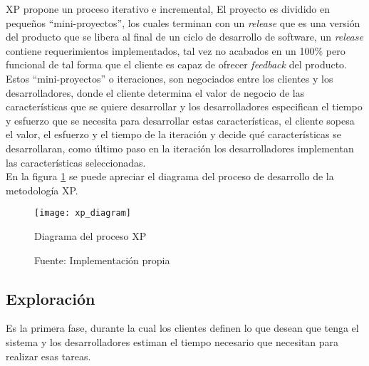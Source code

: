        XP propone un proceso iterativo e incremental, El proyecto es dividido en pequeños “mini-proyectos”, los cuales terminan con un \emph{release} que es una versión del producto que se libera al final de un ciclo de desarrollo de software, un \emph{release} contiene requerimientos implementados, tal vez no acabados en un  100\% pero funcional de tal forma que el cliente es capaz de ofrecer \emph{feedback} del producto. \cite{xp_overview}\\

       Estos ``mini-proyectos'' o iteraciones, son negociados entre los clientes y los desarrolladores, donde el cliente determina el valor de negocio de las características que se quiere desarrollar y los desarrolladores especifican el tiempo y esfuerzo que se necesita para desarrollar estas características, el cliente sopesa el valor, el esfuerzo y el tiempo de la iteración y decide qué características se desarrollaran, como último paso en la iteración los desarrolladores implementan las características seleccionadas. \\


           En la figura \ref{fig:xp_diagram} se puede apreciar el diagrama del proceso de desarrollo de la metodología XP.\\


     \begin{figure}[H]
       \begin{center}
         \texttt{[image: xp\_diagram]}
         \caption{Diagrama del proceso XP}
         \label{fig:xp_diagram}
         \caption*{Fuente: Implementación propia}
       \end{center}
     \end{figure}



       \subsection{Exploración}
       \label{sub:Exploracion}

       Es la primera fase, durante la cual los clientes definen lo que desean que tenga el sistema y los desarrolladores estiman el tiempo necesario que necesitan para realizar esas tareas. \\

